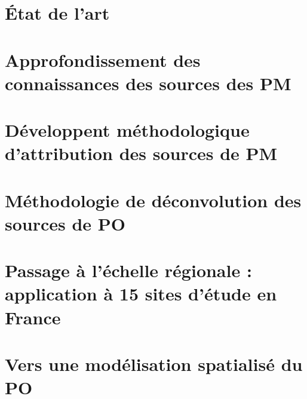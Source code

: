 \documentclass[a4paper,12pt]{book}
\begin{document}
\chapter{État de l'art}
\label{cha:etat_de_lart}
\PartialToc
\clearpage


\chapter{Approfondissement des connaissances des sources des PM}%
\label{cha:approfondissement_des_connaissances_des_sources_des_pm}
\PartialToc
\clearpage



\chapter{Développent méthodologique d'attribution des sources de PM}
\label{cha:developpement_methodologique_dattribution_des_sources_de_PM}
\PartialToc
\clearpage


\chapter{Méthodologie de déconvolution des sources de PO}
\label{cha:methodology_for_the_attribution_of_intrisinc_op_to_a_pm_source}
\PartialToc
\clearpage


\chapter{Passage à l'échelle régionale : application à 15 sites d'étude en France}
\label{cha:application_to_15_sites_in_France}
\PartialToc
\clearpage


\chapter{Vers une modélisation spatialisé du PO}
\label{cha:spatio_temporal_modelizing}
\PartialToc
\clearpage


\printbibliography


\appendix
\setcounter{table}{0}
\setcounter{figure}{0}
\setcounter{equation}{0}
\renewcommand{\thetable}{\thesection-\arabic{table}}
\renewcommand{\thefigure}{\thesection-\arabic{figure}}
\renewcommand{\theequation}{\thesection-\arabic{equation}}
\end{document}
